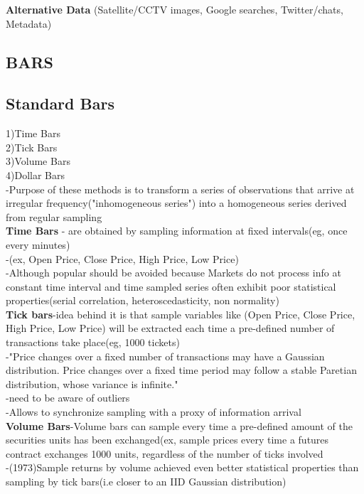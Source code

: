 \documentclass{article}
\begin{document}
\textbullet \textbf{Alternative Data }(Satellite/CCTV images, Google searches, Twitter/chats, Metadata)\\ 


\subsection{BARS}
\subsection{Standard Bars}
1)Time Bars\\ 
2)Tick Bars\\ 
3)Volume Bars\\ 
4)Dollar Bars\\ 

-Purpose of these methods is to transform a series of observations that arrive at irregular frequency("inhomogeneous series") into a homogeneous series derived from regular sampling \\ 

\textbullet \textbf{Time Bars} - are obtained by sampling information at fixed intervals(eg, once every minutes)\\ 
-(ex, Open Price, Close Price, High Price, Low Price)\\ 
-Although popular should be avoided because Markets do not process info at constant time interval and time sampled series often exhibit poor statistical properties(serial correlation, heteroscedasticity, non normality)\\ 

\textbullet\textbf{Tick bars}-idea behind it is that sample variables like (Open Price, Close Price, High Price, Low Price) will be extracted each time a pre-defined number of transactions take place(eg, 1000 tickets)\\ 
-"Price changes over a fixed number of transactions may have a Gaussian distribution. Price changes over a fixed time period may follow a stable Paretian distribution, whose variance is infinite."\\ 
-need to be aware of outliers\\ 
-Allows to synchronize sampling with a proxy of information arrival\\ 

\textbullet\textbf{Volume Bars}-Volume bars can sample every time a pre-defined amount of the securities units has been exchanged(ex, sample prices every time a futures contract exchanges 1000 units, regardless of the number of ticks involved\\ 
-(1973)Sample returns by volume achieved even better statistical properties than sampling by tick bars(i.e closer to an IID Gaussian distribution)\\ 
\end{document}
